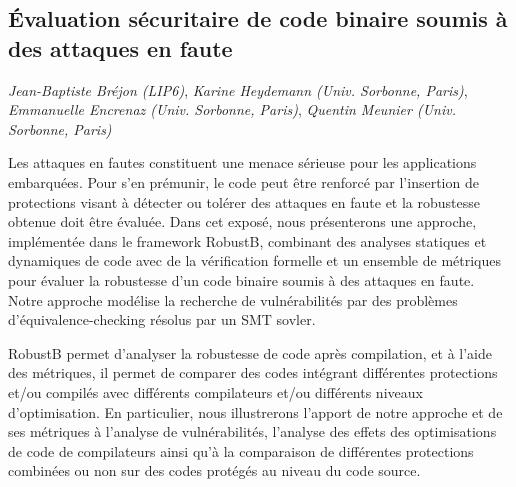 \documentclass[a4paper,11pt]{article}
\begin{document}
\subsection{Évaluation sécuritaire de code binaire soumis à des attaques en faute}
\label{sec:orgd2a7b7d}
\emph{Jean-Baptiste Bréjon (LIP6)},
\emph{Karine Heydemann (Univ. Sorbonne, Paris)},
\emph{Emmanuelle Encrenaz (Univ. Sorbonne, Paris)},
\emph{Quentin Meunier (Univ. Sorbonne, Paris)}

Les attaques en fautes constituent une menace sérieuse pour les
applications embarquées. Pour s’en prémunir, le code peut être
renforcé par l’insertion de protections visant à détecter ou tolérer
des attaques en faute et la robustesse obtenue doit être évaluée. Dans
cet exposé, nous présenterons une approche, implémentée dans le
framework RobustB, combinant des analyses statiques et dynamiques de
code avec de la vérification formelle et un ensemble de métriques pour
évaluer la robustesse d'un code binaire soumis à des attaques en
faute. Notre approche modélise la recherche de vulnérabilités par des
problèmes d'équivalence-checking résolus par un SMT sovler.

RobustB permet d’analyser la robustesse de code après compilation, et
à l’aide des métriques, il permet de comparer des codes intégrant
différentes protections et/ou compilés avec différents compilateurs
et/ou différents niveaux d’optimisation. En particulier, nous
illustrerons l’apport de notre approche et de ses métriques à
l'analyse de vulnérabilités, l'analyse des effets des optimisations de
code de compilateurs ainsi qu'à la comparaison de différentes
protections combinées ou non sur des codes protégés au niveau du code
source.
\end{document}
